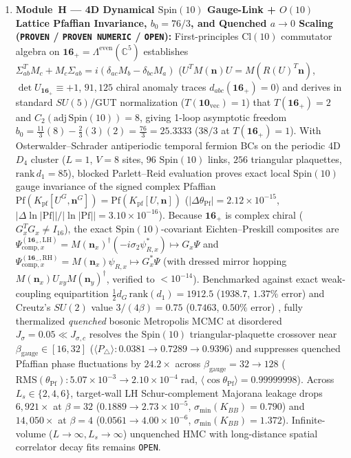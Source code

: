 \documentclass[11pt,a4paper]{article}
\begin{document}
\begin{enumerate}\setlength{\itemsep}{2pt}
\item \textbf{Module~H --- 4D Dynamical $\mathrm{Spin}(10)$ Gauge-Link + $O(10)$ Lattice Pfaffian Invariance, $b_0 = 76/3$, and Quenched $a \to 0$ Scaling (\texttt{PROVEN} / \texttt{PROVEN NUMERIC} / \texttt{OPEN}):}
First-principles $\mathrm{Cl}(10)$ commutator algebra on $\mathbf{16}_+ = \Lambda^{\mathrm{even}}(\mathbb{C}^5)$ establishes $\Sigma_{ab}^T M_c + M_c \Sigma_{ab} = i(\delta_{ac}M_b - \delta_{bc}M_a)$ ($U^T M(\mathbf{n}) U = M(R(U)^T\mathbf{n})$, $\det U_{\mathbf{16}_+} \equiv +1$, $91{,}125$ chiral anomaly traces $d_{abc}(\mathbf{16}_+) = 0$) and derives in standard $SU(5)$/GUT normalization ($T(\mathbf{10}_{\mathrm{vec}})=1$) that $T(\mathbf{16}_+) = 2$ and $C_2(\mathrm{adj}\,\mathrm{Spin}(10)) = 8$, giving 1-loop asymptotic freedom $b_0 = \frac{11}{3}(8) - \frac{2}{3}(3)(2) = \frac{76}{3} = 25.3333$ ($38/3$ at $T(\mathbf{16}_+)=1$). With Osterwalder--Schrader antiperiodic temporal fermion BCs on the periodic 4D $D_4$ cluster ($L=1$, $V=8$ sites, $96$ $\mathrm{Spin}(10)$ links, $256$ triangular plaquettes, $\mathrm{rank}\,d_1 = 85$), blocked Parlett--Reid evaluation \cite{Wimmer2012} proves exact local $\mathrm{Spin}(10)$ gauge invariance of the signed complex Pfaffian $\mathrm{Pf}(K_{\mathrm{pf}}[U^G,\mathbf{n}^G]) = \mathrm{Pf}(K_{\mathrm{pf}}[U,\mathbf{n}])$ ($|\Delta\theta_{\mathrm{Pf}}| = 2.12\times 10^{-15}$, $|\Delta\ln|\mathrm{Pf}||/|\ln|\mathrm{Pf}|| = 3.10\times 10^{-16}$). Because $\mathbf{16}_+$ is complex chiral ($G_x^T G_x \ne I_{16}$), the exact $\mathrm{Spin}(10)$-covariant Eichten--Preskill composites are $\Psi_{\mathrm{comp},x}^{(\mathbf{16}_+,\mathrm{LH})} = M(\mathbf{n}_x)^\dagger(-i\sigma_2\psi_{R,x}^*) \mapsto G_x\Psi$ and $\Psi_{\mathrm{comp},x}^{(\mathbf{16}_-,\mathrm{RH})} = M(\mathbf{n}_x)\psi_{R,x} \mapsto G_x^*\Psi$ (with dressed mirror hopping $M(\mathbf{n}_x)U_{xy}M(\mathbf{n}_y)^\dagger$, verified to $<10^{-14}$). Benchmarked against exact weak-coupling equipartition $\frac{1}{2}d_G\,\mathrm{rank}(d_1) = 1912.5$ ($1938.7$, $1.37\%$ error) and Creutz's $SU(2)$ value $3/(4\beta) = 0.75$ ($0.7463$, $0.50\%$ error) \cite{Creutz1983}, fully thermalized \emph{quenched} bosonic Metropolis MCMC at disordered $J_\sigma = 0.05 \ll J_{\sigma,c}$ resolves the $\mathrm{Spin}(10)$ triangular-plaquette crossover near $\beta_{\mathrm{gauge}}\in[16,32]$ ($\langle P_\triangle\rangle: 0.0381 \to 0.7289 \to 0.9396$) and suppresses quenched Pfaffian phase fluctuations by $24.2\times$ across $\beta_{\mathrm{gauge}} = 32 \to 128$ ($\mathrm{RMS}(\theta_{\mathrm{Pf}}): 5.07\times 10^{-3} \to 2.10\times 10^{-4}\;\mathrm{rad}$, $\langle\cos\theta_{\mathrm{Pf}}\rangle = 0.99999998$). Across $L_s \in \{2,4,6\}$, target-wall LH Schur-complement Majorana leakage drops $6{,}921\times$ at $\beta=32$ ($0.1889 \to 2.73\times 10^{-5}$, $\sigma_{\min}(K_{BB}) = 0.790$) and $14{,}050\times$ at $\beta=4$ ($0.0561 \to 4.00\times 10^{-6}$, $\sigma_{\min}(K_{BB}) = 1.372$). Infinite-volume ($L \to \infty, L_s \to \infty$) unquenched HMC with long-distance spatial correlator decay fits remains \texttt{OPEN}.


\end{enumerate}
\end{document}
